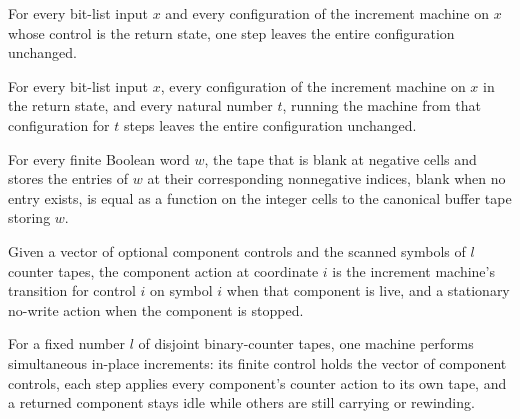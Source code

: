 \begin{lemma}
\label{Complexity.clCount_idle}
\leanok
{}
For every bit-list input $x$ and every configuration of the increment machine on $x$
whose control is the return state, one step leaves the entire configuration unchanged.
\end{lemma}

\begin{lemma}
\label{Complexity.clCount_idle_run}
\leanok
{}
For every bit-list input $x$, every configuration of the increment machine on $x$ in the
return state, and every natural number $t$, running the machine from that configuration
for $t$ steps leaves the entire configuration unchanged.
\end{lemma}

\begin{lemma}
\label{Complexity.clCountTape_eq}
\leanok
{}
For every finite Boolean word $w$, the tape that is blank at negative cells and stores
the entries of $w$ at their corresponding nonnegative indices, blank when no entry
exists, is equal as a function on the integer cells to the canonical buffer tape storing
$w$.
\end{lemma}

\begin{definition}
\label{Complexity.clBankPart}
\leanok
{}
Given a vector of optional component controls and the scanned symbols of $l$ counter tapes, the component action at coordinate $i$ is the increment machine's transition for control $i$ on symbol $i$ when that component is live, and a stationary no-write action when the component is stopped.
\end{definition}

\begin{definition}
\label{Complexity.clBankTM}
\leanok
{}
For a fixed number $l$ of disjoint binary-counter tapes, one machine performs simultaneous in-place increments: its finite control holds the vector of component controls, each step applies every component's counter action to its own tape, and a returned component stays idle while others are still carrying or rewinding.
\end{definition}

